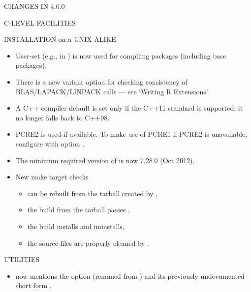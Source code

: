 \documentclass[letterpaper]{book}
\begin{document}
\begin{Section}{ CHANGES IN 4.0.0}
\begin{SubSection}{C-LEVEL FACILITIES}
\end{SubSection}


%
\begin{SubSection}{INSTALLATION on a UNIX-ALIKE}
\begin{itemize}

\item{} User-set  (e.g., in ) is now
used for compiling packages (including base packages).

\item{} There is a new variant option 
for checking consistency of BLAS/LAPACK/LINPACK calls --- see
`Writing R Extensions'.

\item{} A C++ compiler default is set only if the C++11 standard is
supported: it no longer falls back to C++98.

\item{} PCRE2 is used if available.  To make use of PCRE1 if PCRE2
is unavailable, configure with option .

\item{} The minimum required version of  is now 7.28.0
(Oct 2012).

\item{} New make target  checks
\begin{itemize}

\item{} \R{} can be rebuilt from the tarball created by
,
\item{} the build from the tarball passes ,
\item{} the build installs and uninstalls,
\item{} the source files are properly cleaned by .

\end{itemize}


\end{itemize}


\end{SubSection}


%
\begin{SubSection}{UTILITIES}
\begin{itemize}

\item{}  now mentions the option 
(renamed from ) and its previously undocumented
short form .


\end{itemize}
\end{SubSection}
\end{Section}
\end{document}
